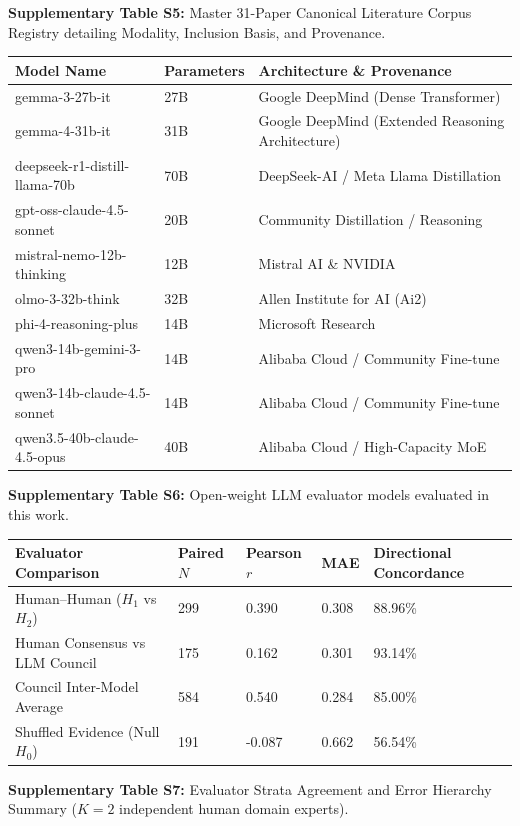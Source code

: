 \documentclass[12pt]{article}
\begin{document}
\textbf{Supplementary Table S5:} Master 31-Paper Canonical Literature Corpus Registry detailing Modality, Inclusion Basis, and Provenance.

\begin{longtable}[]{@{}lll@{}}
\toprule
\textbf{Model Name} & \textbf{Parameters} & \textbf{Architecture \& Provenance} \\
\midrule
\endhead
\bottomrule
\endlastfoot
gemma-3-27b-it & 27B & Google DeepMind (Dense Transformer) \\
gemma-4-31b-it & 31B & Google DeepMind (Extended Reasoning Architecture) \\
deepseek-r1-distill-llama-70b & 70B & DeepSeek-AI / Meta Llama Distillation \\
gpt-oss-claude-4.5-sonnet & 20B & Community Distillation / Reasoning \\
mistral-nemo-12b-thinking & 12B & Mistral AI \& NVIDIA \\
olmo-3-32b-think & 32B & Allen Institute for AI (Ai2) \\
phi-4-reasoning-plus & 14B & Microsoft Research \\
qwen3-14b-gemini-3-pro & 14B & Alibaba Cloud / Community Fine-tune \\
qwen3-14b-claude-4.5-sonnet & 14B & Alibaba Cloud / Community Fine-tune \\
qwen3.5-40b-claude-4.5-opus & 40B & Alibaba Cloud / High-Capacity MoE \\
\end{longtable}

\textbf{Supplementary Table S6:} Open-weight LLM evaluator models evaluated in this work.

\begin{longtable}[]{@{}lllll@{}}
\toprule
\textbf{Evaluator Comparison} & \textbf{Paired $N$} & \textbf{Pearson $r$} & \textbf{MAE} & \textbf{Directional Concordance} \\
\midrule
\endhead
\bottomrule
\endlastfoot
Human--Human ($H_1$ vs $H_2$) & 299 & 0.390 & 0.308 & 88.96\% \\
Human Consensus vs LLM Council & 175 & 0.162 & 0.301 & 93.14\% \\
Council Inter-Model Average & 584 & 0.540 & 0.284 & 85.00\% \\
Shuffled Evidence (Null $H_0$) & 191 & -0.087 & 0.662 & 56.54\% \\
\end{longtable}

\textbf{Supplementary Table S7:} Evaluator Strata Agreement and Error Hierarchy Summary ($K=2$ independent human domain experts).
\end{document}
